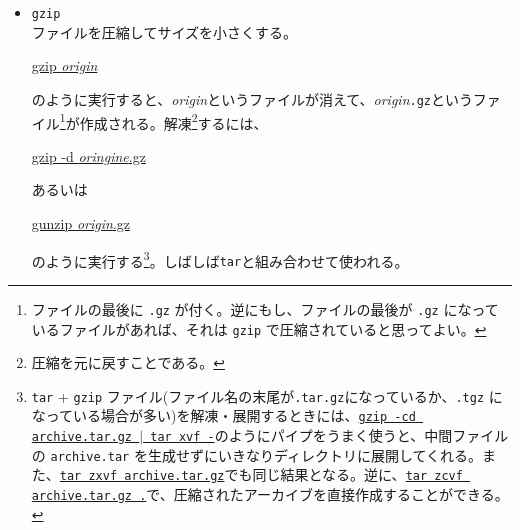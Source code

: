\begin{itemize}
  ファイルをまとめて一つにまとめる。{\bf t}ape {\bf ar}chiverの略である。ファイルを転送したり、バックアップを取るときに利用する。
  \begin{commandline2}
    \prompt \underline{tar cvf ../archive.tar .}
  \end{commandline2} \noindent
  のように使うと、{\tt ../archive.tar} というファイル\footnote{ファイル名の最後に {\tt .tar} を付ける習慣にしておくと、あとで混乱が少なくなる。}にカレントディレクトリ以下のすべてのファイルのバックアップが取られる。{\tt .} の代わりに {\tt $\ast$.c} を使えば カレントディレクトリの {\tt .c} で終るファイルがまとめられる。また、{\tt .} の部分にディレクトリを指定すれば、そのディレクトリ以下のファイルすべてのバックアップを取ることができる。反対に展開するときは、
  \begin{commandline2}
    \prompt \underline{tar xvf archive.tar}
  \end{commandline2} \noindent
  のようにする。
\item {\tt gzip}\\
ファイルを圧縮してサイズを小さくする。
\begin{commandline2}
\prompt \underline{gzip {\it origin}}
\end{commandline2} \noindent
のように実行すると、{\it origin}というファイルが消えて、{\it origin}{\tt .gz}というファイル\footnote{ファイルの最後に {\tt .gz} が付く。逆にもし、ファイルの最後が {\tt .gz} になっているファイルがあれば、それは {\tt gzip} で圧縮されていると思ってよい。}が作成される。解凍\footnote{圧縮を元に戻すことである。}するには、
\begin{commandline2}
\prompt \underline{gzip -d {\it oringine}.gz}
\end{commandline2} \noindent
あるいは
\begin{commandline2}
\prompt \underline{gunzip {\it origin}.gz}
\end{commandline2} \noindent
のように実行する\footnote{{\tt tar} + {\tt gzip} ファイル(ファイル名の末尾が{\tt .tar.gz}になっているか、{\tt .tgz} になっている場合が多い)を解凍・展開するときには、{\tt \underline{gzip -cd archive.tar.gz $|$ tar xvf -}}のようにパイプをうまく使うと、中間ファイルの {\tt archive.tar} を生成せずにいきなりディレクトリに展開してくれる。また、\underline{\tt tar zxvf archive.tar.gz}でも同じ結果となる。逆に、\underline{\tt tar zcvf archive.tar.gz .}で、圧縮されたアーカイブを直接作成することができる。}。しばしば{\tt tar}と組み合わせて使われる。



\end{itemize}
